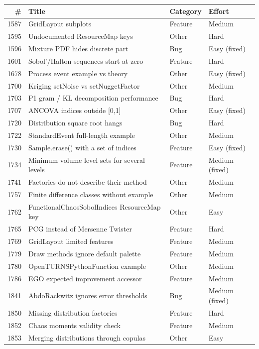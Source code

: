 \documentclass[a4paper,11pt]{article}
\begin{document}
\footnotesize
\begin{longtable}{rp{8.4cm}ll}
\toprule
\# & Title & Category & Effort \\
\midrule
\endhead
1587 & GridLayout subplots & Feature & Medium \\
1595 & Undocumented ResourceMap keys & Other & Hard \\
1596 & Mixture PDF hides discrete part & Bug & Easy (fixed) \\
1601 & Sobol'/Halton sequences start at zero & Feature & Hard \\
1678 & Process event example vs theory & Other & Easy (fixed) \\
1700 & Kriging setNoise vs setNuggetFactor & Other & Medium \\
1703 & P1 gram / KL decomposition performance & Bug & Hard \\
1707 & ANCOVA indices outside [0,1] & Other & Easy (fixed) \\
1720 & Distribution square root hangs & Bug & Hard \\
1722 & StandardEvent full-length example & Other & Medium \\
1730 & Sample.erase() with a set of indices & Feature & Easy (fixed) \\
1734 & Minimum volume level sets for several levels & Feature & Medium (fixed) \\
1741 & Factories do not describe their method & Other & Medium \\
1757 & Finite difference classes without example & Other & Medium \\
1762 & FunctionalChaosSobolIndices ResourceMap key & Other & Easy \\
1765 & PCG instead of Mersenne Twister & Feature & Hard \\
1769 & GridLayout limited features & Feature & Medium \\
1779 & Draw methods ignore default palette & Feature & Medium \\
1780 & OpenTURNSPythonFunction example & Other & Medium \\
1786 & EGO expected improvement accessor & Feature & Medium \\
1841 & AbdoRackwitz ignores error thresholds & Bug & Medium (fixed) \\
1850 & Missing distribution factories & Feature & Hard \\
1852 & Chaos moments validity check & Feature & Medium \\
1853 & Merging distributions through copulas & Other & Easy \\

\end{longtable}
\end{document}
